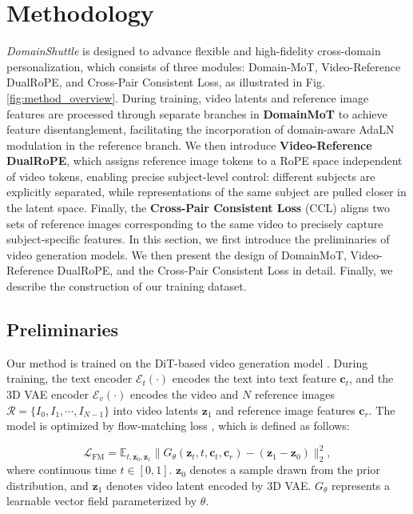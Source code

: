 \section{Methodology}

\textit{DomainShuttle} is designed to advance flexible and high-fidelity cross-domain personalization, which consists of three modules: Domain-MoT, Video-Reference DualRoPE, and Cross-Pair Consistent Loss, as illustrated in Fig. \ref{fig:method_overview}. During training,  video latents and reference image features are processed through separate branches in \textbf{DomainMoT} to achieve feature disentanglement, facilitating the incorporation of domain-aware AdaLN modulation in the reference branch. We then introduce \textbf{Video-Reference DualRoPE}, which assigns reference image tokens to a RoPE space independent of video tokens, enabling precise subject-level control: different subjects are explicitly separated, while representations of the same subject are pulled closer in the latent space. Finally, the \textbf{Cross-Pair Consistent Loss} (CCL) aligns two sets of reference images corresponding to the same video to precisely capture subject-specific features. In this section, we first introduce the preliminaries of video generation models. We then present the design of DomainMoT, Video-Reference  DualRoPE, and the Cross-Pair Consistent Loss in detail. Finally, we describe the construction of our training dataset.






\subsection{Preliminaries} 

Our method is trained on the DiT-based video generation model \cite{wan2025wan}. During training, the text encoder  $\boldsymbol{\mathcal{E}}_t(\cdot)$ \cite{chung2023unimax} encodes the text into text feature $\boldsymbol{c}_t$, and the 3D VAE encoder  $\boldsymbol{\mathcal{E}}_v(\cdot)$ encodes the video and $N$ reference images $\mathcal{R} = \{ I_0, I_1, \cdots, I_{N-1} \}$ into video latents $\boldsymbol{z}_1$ and reference image features $\boldsymbol{c}_r$. The model is optimized by flow-matching loss \cite{lipman2023flow}, which is defined as follows:

\begin{equation}
\mathcal{L}_{\mathrm{FM}}=\mathbb{E}_{t,\boldsymbol{z}_0,\boldsymbol{z}_1}\|{G}_\theta(\boldsymbol{z}_t,t,\boldsymbol{c}_t,\boldsymbol{c}_r)-(\boldsymbol{z}_1-\boldsymbol{z}_0)\|_2^2,
\label{eq:flow_matching_loss}
\end{equation}
where continuous time $t\in[0,1]$. $\boldsymbol{z}_0$ denotes a sample drawn from the prior distribution, and $\boldsymbol{z}_1$ denotes video latent encoded by 3D VAE. ${G}_\theta$ represents a learnable vector field parameterized by $\theta$.

